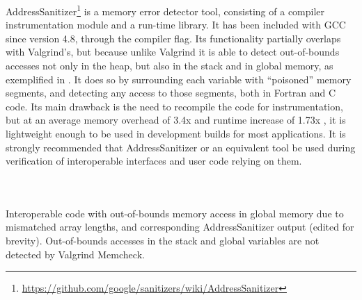 AddressSanitizer\footnote{\url{https://github.com/google/sanitizers/wiki/AddressSanitizer}} is a memory error detector tool, consisting of a compiler instrumentation module and a run-time library. It has been included with GCC since version 4.8, through the  compiler flag. Its functionality partially overlaps with Valgrind's, but because unlike Valgrind it is able to detect out-of-bounds accesses not only in the heap, but also in the stack and in global memory, as exemplified in . It does so by surrounding each variable with ``poisoned'' memory segments, and detecting any access to those segments, both in Fortran and C code. Its main drawback is the need to recompile the code for instrumentation, but at an average memory overhead of 3.4x and runtime increase of 1.73x \cite{serebryany2012addresssanitizer}, it is lightweight enough to be used in development builds for most applications. It is strongly recommended that AddressSanitizer or an equivalent tool be used during verification of interoperable interfaces and user code relying on them.

\begin{listing}
    \inputminted{Fortran}{src/misc/asan/fsrc.f90}
    \inputminted{C}{src/misc/asan/csrc.c}
    \inputminted[fontsize=\small]{text}{src/misc/asan/output.txt}
    \caption{Interoperable code with out-of-bounds memory access in global memory due to mismatched array lengths, and corresponding AddressSanitizer output (edited for brevity). Out-of-bounds accesses in the stack and global variables are not detected by Valgrind Memcheck.}
    \label{src:asan}
\end{listing} 